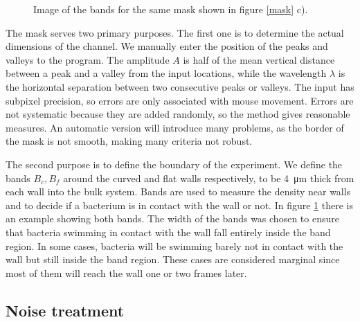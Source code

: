 \begin{figure}
\vspace{-20pt}
\centering

\caption[Bands example]{Image of the bands for the same mask shown in figure \ref{mask} c).}
\label{bands}
\end{figure}


The mask serves two primary purposes. The first one is to determine the actual dimensions of the channel. We manually enter the position of the peaks and valleys to the program. The amplitude $A$ is half of the mean vertical distance between a peak and a valley from the input locations, while the wavelength $\lambda$ is the horizontal separation between two consecutive peaks or valleys. The input has subpixel precision, so errors are only associated with mouse movement. Errors are not systematic because they are added randomly, so the method gives reasonable measures.  An automatic version will introduce many problems, as the border of the mask is not smooth, making many criteria not robust.

The second purpose is to define the boundary of the experiment. We define the bands $B_{c},B_{f}$ around the curved and flat walls respectively, to be \SI{4}{\micro\meter} thick from each wall into the bulk system. Bands are used to measure the density near walls and to decide if a bacterium is in contact with the wall or not. In figure \ref{bands} there is an example showing both bands. The width of the bands was chosen to ensure that bacteria swimming in contact with the wall fall entirely inside the band region. In some cases, bacteria will be swimming barely not in contact with the wall but still inside the band region. These cases are considered marginal since most of them will reach the wall one or two frames later.


\label{section: noise remove}
\subsection{Noise treatment}


